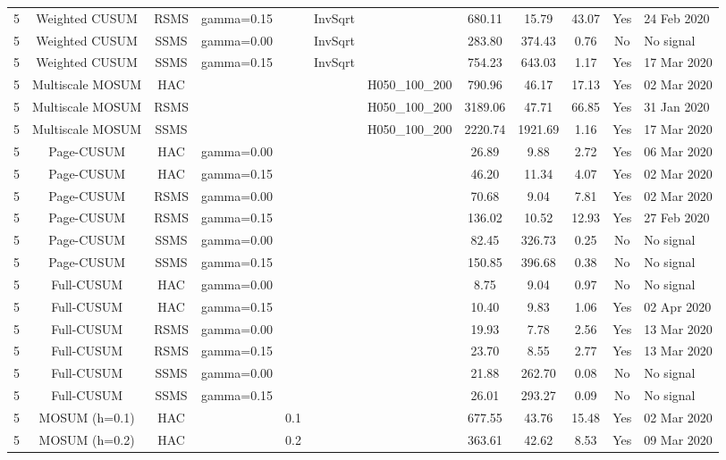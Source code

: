 \begin{table}[htbp]
\begin{tabular}{cccccccccccl}
5 & Weighted CUSUM & RSMS & gamma=0.15 &  & InvSqrt &  & 680.11 & 15.79 & 43.07 & Yes & 24 Feb 2020 \\
5 & Weighted CUSUM & SSMS & gamma=0.00 &  & InvSqrt &  & 283.80 & 374.43 & 0.76 & No & No signal \\
5 & Weighted CUSUM & SSMS & gamma=0.15 &  & InvSqrt &  & 754.23 & 643.03 & 1.17 & Yes & 17 Mar 2020 \\
5 & Multiscale MOSUM & HAC &  &  &  & H050_100_200 & 790.96 & 46.17 & 17.13 & Yes & 02 Mar 2020 \\
5 & Multiscale MOSUM & RSMS &  &  &  & H050_100_200 & 3189.06 & 47.71 & 66.85 & Yes & 31 Jan 2020 \\
5 & Multiscale MOSUM & SSMS &  &  &  & H050_100_200 & 2220.74 & 1921.69 & 1.16 & Yes & 17 Mar 2020 \\
5 & Page-CUSUM & HAC & gamma=0.00 &  &  &  & 26.89 & 9.88 & 2.72 & Yes & 06 Mar 2020 \\
5 & Page-CUSUM & HAC & gamma=0.15 &  &  &  & 46.20 & 11.34 & 4.07 & Yes & 02 Mar 2020 \\
5 & Page-CUSUM & RSMS & gamma=0.00 &  &  &  & 70.68 & 9.04 & 7.81 & Yes & 02 Mar 2020 \\
5 & Page-CUSUM & RSMS & gamma=0.15 &  &  &  & 136.02 & 10.52 & 12.93 & Yes & 27 Feb 2020 \\
5 & Page-CUSUM & SSMS & gamma=0.00 &  &  &  & 82.45 & 326.73 & 0.25 & No & No signal \\
5 & Page-CUSUM & SSMS & gamma=0.15 &  &  &  & 150.85 & 396.68 & 0.38 & No & No signal \\
5 & Full-CUSUM & HAC & gamma=0.00 &  &  &  & 8.75 & 9.04 & 0.97 & No & No signal \\
5 & Full-CUSUM & HAC & gamma=0.15 &  &  &  & 10.40 & 9.83 & 1.06 & Yes & 02 Apr 2020 \\
5 & Full-CUSUM & RSMS & gamma=0.00 &  &  &  & 19.93 & 7.78 & 2.56 & Yes & 13 Mar 2020 \\
5 & Full-CUSUM & RSMS & gamma=0.15 &  &  &  & 23.70 & 8.55 & 2.77 & Yes & 13 Mar 2020 \\
5 & Full-CUSUM & SSMS & gamma=0.00 &  &  &  & 21.88 & 262.70 & 0.08 & No & No signal \\
5 & Full-CUSUM & SSMS & gamma=0.15 &  &  &  & 26.01 & 293.27 & 0.09 & No & No signal \\
5 & MOSUM (h=0.1) & HAC &  & 0.1 &  &  & 677.55 & 43.76 & 15.48 & Yes & 02 Mar 2020 \\
5 & MOSUM (h=0.2) & HAC &  & 0.2 &  &  & 363.61 & 42.62 & 8.53 & Yes & 09 Mar 2020 \\

\end{tabular}
\end{table}
